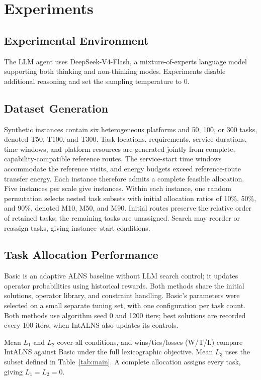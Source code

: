 \section{Experiments}
\label{sec:experiments}


\subsection{Experimental Environment}
The LLM agent uses DeepSeek-V4-Flash, a mixture-of-experts language model supporting both thinking and non-thinking modes. Experiments disable additional reasoning and set the sampling temperature to 0.

\subsection{Dataset Generation}
Synthetic instances contain six heterogeneous platforms and 50, 100, or 300 tasks, denoted T50, T100, and T300. Task locations, requirements, service durations, time windows, and platform resources are generated jointly from complete, capability-compatible reference routes. The service-start time windows accommodate the reference visits, and energy budgets exceed reference-route transfer energy. Each instance therefore admits a complete feasible allocation. Five instances per scale give \InstanceCount{} instances. Within each instance, one random permutation selects nested task subsets with initial allocation ratios of 10\%, 50\%, and 90\%, denoted M10, M50, and M90. Initial routes preserve the relative order of retained tasks; the remaining tasks are unassigned. Search may reorder or reassign tasks, giving \PairCount{} instance--start conditions.

\subsection{Task Allocation Performance}
Basic is an adaptive ALNS baseline without LLM search control; it updates operator probabilities using historical rewards. Both methods share the initial solutions, operator library, and constraint handling. Basic's parameters were selected on a small separate tuning set, with one configuration per task count. Both methods use algorithm seed 0 and 1200 iters; best solutions are recorded every 100 iters, when IntALNS also updates its controls.

Mean $L_1$ and $L_2$ cover all conditions, and wins/ties/losses (W/T/L) compare IntALNS against Basic under the full lexicographic objective. Mean $L_3$ uses the subset defined in Table~\ref{tab:main}. A complete allocation assigns every task, giving $L_1=L_2=0$.

